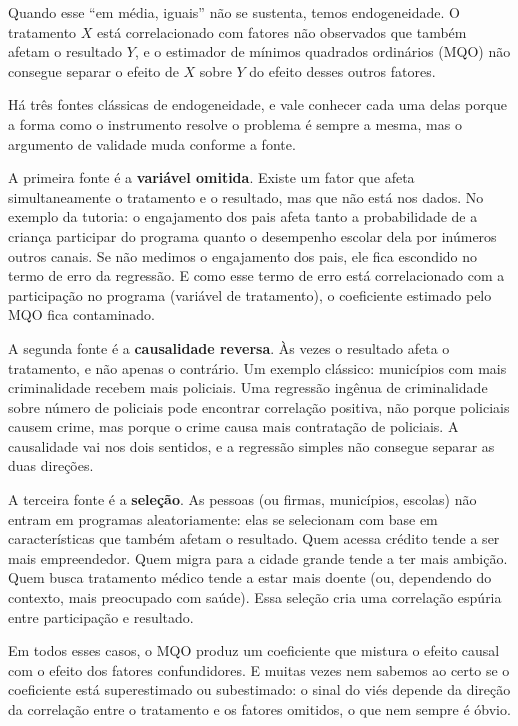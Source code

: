 Quando esse ``em média, iguais'' não se sustenta, temos endogeneidade. O tratamento $X$ está correlacionado com fatores não observados que também afetam o resultado $Y$, e o estimador de mínimos quadrados ordinários (MQO) não consegue separar o efeito de $X$ sobre $Y$ do efeito desses outros fatores.

Há três fontes clássicas de endogeneidade, e vale conhecer cada uma delas porque a forma como o instrumento resolve o problema é sempre a mesma, mas o argumento de validade muda conforme a fonte.

A primeira fonte é a \textbf{variável omitida}. Existe um fator que afeta simultaneamente o tratamento e o resultado, mas que não está nos dados. No exemplo da tutoria: o engajamento dos pais afeta tanto a probabilidade de a criança participar do programa quanto o desempenho escolar dela por inúmeros outros canais. Se não medimos o engajamento dos pais, ele fica escondido no termo de erro da regressão. E como esse termo de erro está correlacionado com a participação no programa (variável de tratamento), o coeficiente estimado pelo MQO fica contaminado.

A segunda fonte é a \textbf{causalidade reversa}. Às vezes o resultado afeta o tratamento, e não apenas o contrário. Um exemplo clássico: municípios com mais criminalidade recebem mais policiais. Uma regressão ingênua de criminalidade sobre número de policiais pode encontrar correlação positiva, não porque policiais causem crime, mas porque o crime causa mais contratação de policiais. A causalidade vai nos dois sentidos, e a regressão simples não consegue separar as duas direções.

A terceira fonte é a \textbf{seleção}. As pessoas (ou firmas, municípios, escolas) não entram em programas aleatoriamente: elas se selecionam com base em características que também afetam o resultado. Quem acessa crédito tende a ser mais empreendedor. Quem migra para a cidade grande tende a ter mais ambição. Quem busca tratamento médico tende a estar mais doente (ou, dependendo do contexto, mais preocupado com saúde). Essa seleção cria uma correlação espúria entre participação e resultado.

Em todos esses casos, o MQO produz um coeficiente que mistura o efeito causal com o efeito dos fatores confundidores. E muitas vezes nem sabemos ao certo se o coeficiente está superestimado ou subestimado: o sinal do viés depende da direção da correlação entre o tratamento e os fatores omitidos, o que nem sempre é óbvio.

